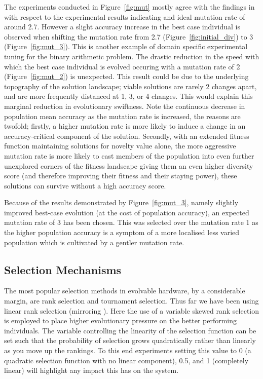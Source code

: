 The experiments conducted in Figure~\ref{fig:mut} mostly agree with the findings
in \cite{10.1007/3-540-63173-9_61} with respect to the experimental results indicating
and ideal mutation rate of around 2.7. However a slight accuracy increase in the
best case individual is
observed when shifting the mutation rate from 2.7 (Figure~\ref{fig:initial_div})
to 3 (Figure~\ref{fig:mut_3}). This is another example of domain specific experimental
tuning for the binary arithmetic problem. The drastic reduction in the speed with which
the best case individual is evolved occuring with a mutation rate of 2
(Figure~\ref{fig:mut_2}) is unexpected. This result could be due to the underlying
topography of the solution landscape; viable solutions are rarely 2 changes apart,
and are more frequently distanced at 1, 3, or 4 changes. This would explain this
marginal reduction in evolutionary swiftness. Note the continuous decrease in population mean accuracy
as the mutation rate is increased, the reasons are twofold; firstly, a higher mutation
rate is more likely to induce a change in an accuracy-critical component of the
solution. Secondly, with an extended fitness function maintaining solutions for
novelty value alone, the more aggressive mutation rate is more likely to cast members of the
population into even further unexplored corners of the fitness landscape giving them
an even higher diversity score (and therefore improving their fitness and their staying power),
these solutions can survive without a high accuracy score.

Because of the results demonstrated by Figure~\ref{fig:mut_3}, namely slightly
improved best-case evolution (at the cost of population accuracy), an expected
mutation rate of 3 has been chosen. This was selected over the mutation rate 1
as the higher population accuracy is a symptom of a more localised less varied
population which is cultivated by a gentler mutation rate.

\subsection{Selection Mechanisms}
The most popular selection methods in evolvable hardware, by a considerable margin, are
rank selection and tournament selection. Thus far we have been using linear
rank selection (mirroring \cite{10.1007/3-540-63173-9_61}). Here the use
of a variable skewed rank selection is employed to place higher evolutionary pressure
on the better performing individuals. The variable controlling the linearity
of the selection function can be set such that the probability of selection
grows quadratically rather than linearly as you move up the rankings. To this
end experiments setting this value to 0 (a quadratic selection function with no linear
component), 0.5, and 1
(completely linear) will highlight any impact this has on the system.

